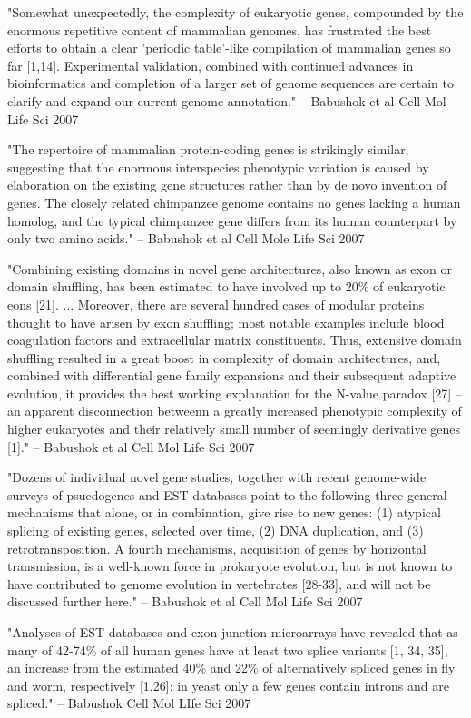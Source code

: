 \documentclass[10pt]{article}
\begin{document}
"Somewhat unexpectedly, the complexity of eukaryotic genes, compounded by the enormous repetitive content of mammalian genomes, has frustrated the best efforts to obtain a clear 'periodic table'-like compilation of mammalian genes so far [1,14].  Experimental validation, combined with continued advances in bioinformatics and completion of a larger set of genome sequences are certain to clarify and expand our current genome annotation." -- Babushok et al Cell Mol Life Sci 2007

"The repertoire of mammalian protein-coding genes is strikingly similar, suggesting that the enormous interspecies phenotypic variation is caused by elaboration on the existing gene structures rather than by de novo invention of genes.  The closely related chimpanzee genome contains no genes lacking a human homolog, and the typical chimpanzee gene differs from its human counterpart by only two amino acids."  -- Babushok et al Cell Mole Life Sci 2007

"Combining existing domains in novel gene architectures, also known as exon or domain shuffling, has been estimated to have involved up to 20\% of eukaryotic eons [21].  ... Moreover, there are several hundred cases of modular proteins thought to have arisen by exon shuffling; most notable examples include blood coagulation factors and extracellular matrix constituents.  Thus, extensive domain shuffling resulted in a great boost in complexity of domain architectures, and, combined with differential gene family expansions and their subsequent adaptive evolution, it provides the best working explanation for the N-value paradox [27] -- an apparent disconnection betweenn a greatly increased phenotypic complexity of higher eukaryotes and their relatively small number of seemingly derivative genes [1]."  -- Babushok et al Cell Mol Life Sci 2007

"Dozens of individual novel gene studies, together with recent genome-wide surveys of psuedogenes and EST databases point to the following three general mechanisms that alone, or in combination, give rise to new genes: (1) atypical splicing of existing genes, selected over time, (2) DNA duplication, and (3) retrotransposition.  A fourth mechanisms, acquisition of genes by horizontal transmission, is a well-known force in prokaryote evolution, but is not known to have contributed to genome evolution in vertebrates [28-33], and will not be discussed further here."  -- Babushok et al Cell Mol Life Sci 2007

"Analyses of EST databases and exon-junction microarrays have revealed that as many of 42-74\% of all human genes have at least two splice variants [1, 34, 35], an increase from the estimated 40\% and 22\% of alternatively spliced genes in fly and worm, respectively [1,26]; in yeast only a few genes contain introns and are spliced." -- Babushok Cell Mol LIfe Sci 2007
\end{document}
